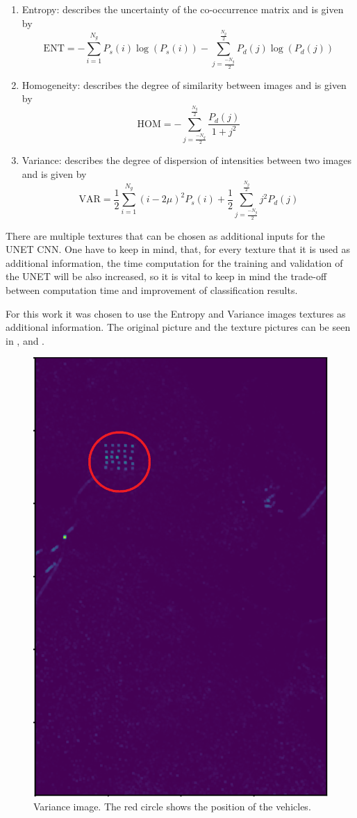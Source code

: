 \begin{enumerate}
    \item Entropy: describes the uncertainty of the co-occurrence matrix and is given by
    \begin{equation}
        \textrm{ENT} = -\sum_{i=1}^{N_g}P_s(i)\log(P_s(i)) - \sum_{j=\frac{-N_g}{2}}^{\frac{N_g}{2}} P_d(j)\log(P_d(j))
    \end{equation}
    
    \item Homogeneity: describes the degree of similarity between images and is given by
    \begin{equation}
        \textrm{HOM} = - \sum_{j=\frac{-N_g}{2}}^{\frac{N_g}{2}} \frac{P_d(j)}{1+j^2}
    \end{equation}
    
    \item Variance: describes the degree of dispersion of intensities between two images and is given by
    \begin{equation}
        \textrm{VAR} = \frac{1}{2} \sum_{i=1}^{N_g}(i-2\mu)^2 P_s(i) + 
         \frac{1}{2}\sum_{j=\frac{-N_g}{2}}^{\frac{N_g}{2}} j^2 P_d(j)
    \end{equation}
\end{enumerate}

There are multiple textures that can be chosen as additional inputs for the UNET CNN. One have to keep in mind, that, for every texture that it is used as additional information, 
the time computation for the training and validation of the UNET will be also increased, so it is vital to keep in mind the trade-off between computation time and improvement of classification results.

For this work it was chosen to use the Entropy and Variance images textures as additional information. The original picture and the texture pictures can be seen in ,  and .



\begin{figure}[ht]
    \centering
    \includegraphics[width=0.45\linewidth]{Chapter7/variance_exemplo.png}
    \caption{Variance image. The red circle shows the position of the vehicles.}
    \label{fig:variance_example}
\end{figure}


